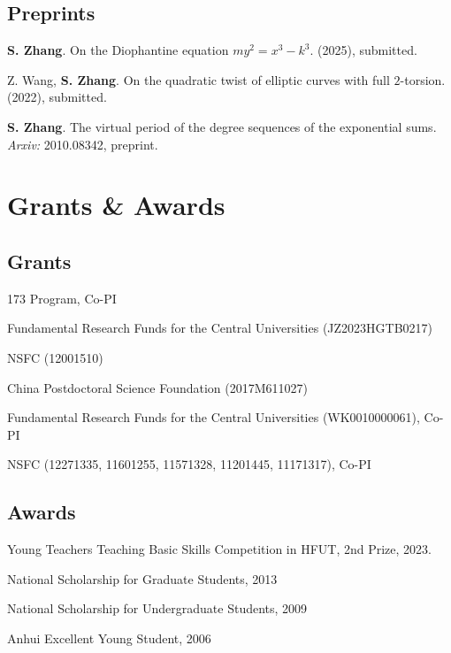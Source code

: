 \documentclass[11pt]{article}
\begin{document}
\subsection{Preprints}
\begin{cvlist}
	\item \textbf{S. Zhang}.
	On the Diophantine equation $my^2=x^3-k^3$.
	(2025), submitted.

	\item Z. Wang, \textbf{S. Zhang}.
	On the quadratic twist of elliptic curves with full $2$-torsion.
	(2022), submitted.

	\item \textbf{S. Zhang}.
	The virtual period of the degree sequences of the exponential sums.
	{\em Arxiv:} 2010.08342, preprint.
\end{cvlist}


\section{Grants \& Awards}
\subsection{Grants}
\begin{cvlist}
	\item 173 Program, Co-PI
	\item Fundamental Research Funds for the Central Universities (JZ2023HGTB0217)
	\item NSFC (12001510)
	\item China Postdoctoral Science Foundation (2017M611027)
	\item Fundamental Research Funds for the Central Universities (WK0010000061), Co-PI
	\item NSFC (12271335, 11601255, 11571328, 11201445, 11171317), Co-PI
\end{cvlist}


\subsection{Awards}
\begin{cvlist}
	\item Young Teachers Teaching Basic Skills Competition in HFUT, 2nd Prize, 2023.
	\item National Scholarship for Graduate Students, 2013
	\item National Scholarship for Undergraduate Students, 2009
	\item Anhui Excellent Young Student, 2006
\end{cvlist}
\end{document}

